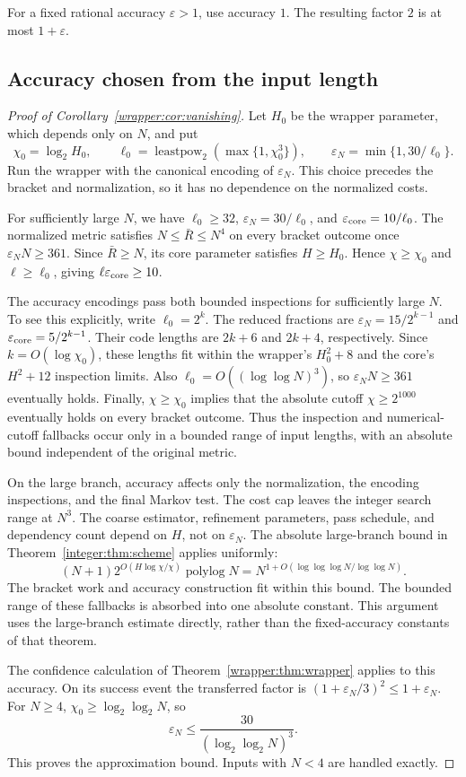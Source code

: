 \documentclass[11pt]{article}
\theoremstyle{definition}
\newcommand{\1}{\mathbf 1}
\begin{document}
For a fixed rational accuracy $\varepsilon>1$, use accuracy $1$. The resulting factor $2$ is at most $1+\varepsilon$.


\subsection{Accuracy chosen from the input length}

\begin{proof}[Proof of Corollary~\ref{wrapper:cor:vanishing}]
Let $H_0$ be the wrapper parameter, which depends only on $N$, and put
\[
 \chi_0=\log_2H_0,\qquad
 \ell_0=\operatorname{leastpow}_2(\max\{1,\chi_0^3\}),\qquad
 \varepsilon_N=\min\{1,30/\ell_0\}.
\]
Run the wrapper with the canonical encoding of $\varepsilon_N$.
This choice precedes the bracket and normalization, so it has no
dependence on the normalized costs.

For sufficiently large $N$, we have $\ell_0\ge32$,
$\varepsilon_N=30/\ell_0$, and
$\varepsilon_{\rm core}=10/\ell_0$.
The normalized metric satisfies $N\le\bar R\le N^4$ on every bracket
outcome once $\varepsilon_NN\ge361$.
Since $\bar R\ge N$, its core parameter satisfies $H\ge H_0$.
Hence $\chi\ge\chi_0$ and $\ell\ge\ell_0$, giving
$\ell\varepsilon_{\rm core}\ge10$.

The accuracy encodings pass both bounded inspections for sufficiently
large $N$. To see this explicitly, write $\ell_0=2^k$.
The reduced fractions are $\varepsilon_N=15/2^{k-1}$ and
$\varepsilon_{\rm core}=5/2^{k-1}$.
Their code lengths are $2k+6$ and $2k+4$, respectively.
Since $k=O(\log\chi_0)$, these lengths fit within the wrapper's
$H_0^2+8$ and the core's $H^2+12$ inspection limits.
Also $\ell_0=O((\log\log N)^3)$, so
$\varepsilon_NN\ge361$ eventually holds.
Finally, $\chi\ge\chi_0$ implies that the absolute cutoff
$\chi\ge2^{1000}$ eventually holds on every bracket outcome.
Thus the inspection and numerical-cutoff fallbacks occur only in a
bounded range of input lengths,
with an absolute bound independent of the original metric.

On the large branch, accuracy affects only the normalization, the
encoding inspections, and the final Markov test. The cost cap leaves
the integer search range at $N^3$. The coarse estimator, refinement
parameters, pass schedule, and dependency count depend on $H$, not
on $\varepsilon_N$. The absolute large-branch bound in
Theorem~\ref{integer:thm:scheme} applies uniformly:
\[
 (N+1)2^{O(H\log\chi/\chi)}\operatorname{polylog}N
 =N^{1+O(\log\log\log N/\log\log N)}.
\]
The bracket work and accuracy construction fit within this bound.
The bounded range of these fallbacks is absorbed into one absolute
constant. This argument uses the large-branch estimate directly,
rather than the fixed-accuracy constants of that theorem.

The confidence calculation of Theorem~\ref{wrapper:thm:wrapper} applies
to this accuracy. On its success event the transferred factor is
$(1+\varepsilon_N/3)^2\le1+\varepsilon_N$.
For $N\ge4$, $\chi_0\ge\log_2\log_2N$, so
\[
 \varepsilon_N\le\frac{30}{(\log_2\log_2N)^3}.
\]
This proves the approximation bound. Inputs with $N<4$ are handled
exactly.
\end{proof}
\end{document}

